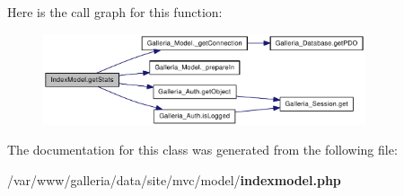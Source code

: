 Here is the call graph for this function:\nopagebreak
\begin{figure}[H]
\begin{center}
\leavevmode
\includegraphics[width=269pt]{classIndexModel_663be11207a8ff64aa0bbb268ad015b1_cgraph}
\end{center}
\end{figure}


The documentation for this class was generated from the following file:\begin{CompactItemize}
\item 
/var/www/galleria/data/site/mvc/model/{\bf indexmodel.php}\end{CompactItemize}
